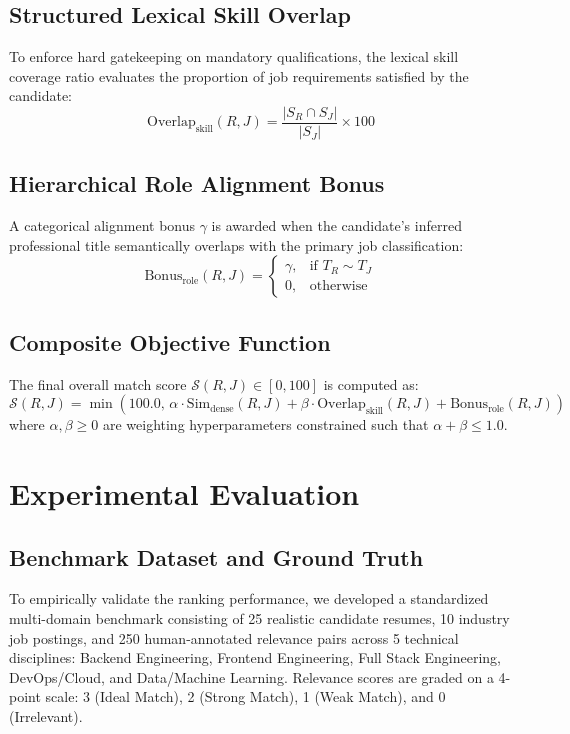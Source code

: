 \documentclass[conference]{IEEEtran}
\begin{document}
\subsection{Structured Lexical Skill Overlap}
To enforce hard gatekeeping on mandatory qualifications, the lexical skill coverage ratio evaluates the proportion of job requirements satisfied by the candidate:
\begin{equation}
\text{Overlap}_{\text{skill}}(R, J) = \frac{|S_R \cap S_J|}{|S_J|} \times 100
\end{equation}

\subsection{Hierarchical Role Alignment Bonus}
A categorical alignment bonus $\gamma$ is awarded when the candidate's inferred professional title semantically overlaps with the primary job classification:
\begin{equation}
\text{Bonus}_{\text{role}}(R, J) = 
\begin{cases} 
\gamma, & \text{if } T_R \sim T_J \\
0, & \text{otherwise}
\end{cases}
\end{equation}

\subsection{Composite Objective Function}
The final overall match score $\mathcal{S}(R, J) \in [0, 100]$ is computed as:
\begin{equation}
\mathcal{S}(R, J) = \min\left(100.0, \, \alpha \cdot \text{Sim}_{\text{dense}}(R, J) + \beta \cdot \text{Overlap}_{\text{skill}}(R, J) + \text{Bonus}_{\text{role}}(R, J)\right)
\end{equation}
where $\alpha, \beta \ge 0$ are weighting hyperparameters constrained such that $\alpha + \beta \le 1.0$.

\section{Experimental Evaluation}

\subsection{Benchmark Dataset and Ground Truth}
To empirically validate the ranking performance, we developed a standardized multi-domain benchmark consisting of 25 realistic candidate resumes, 10 industry job postings, and 250 human-annotated relevance pairs across 5 technical disciplines: Backend Engineering, Frontend Engineering, Full Stack Engineering, DevOps/Cloud, and Data/Machine Learning. Relevance scores are graded on a 4-point scale: 3 (Ideal Match), 2 (Strong Match), 1 (Weak Match), and 0 (Irrelevant).
\end{document}
